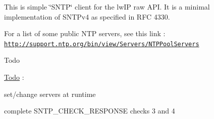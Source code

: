 This is simple \char`\"{}\+S\+N\+T\+P\char`\"{} client for the lw\+IP raw A\+PI. It is a minimal implementation of S\+N\+T\+Pv4 as specified in R\+FC 4330.

For a list of some public N\+TP servers, see this link \+: \href{http://support.ntp.org/bin/view/Servers/NTPPoolServers}{\tt http\+://support.\+ntp.\+org/bin/view/\+Servers/\+N\+T\+P\+Pool\+Servers}

\begin{DoxyRefDesc}{Todo}
\item[\hyperlink{todo__todo000015}{Todo}]\+:
\begin{DoxyItemize}
\item set/change servers at runtime
\item complete S\+N\+T\+P\+\_\+\+C\+H\+E\+C\+K\+\_\+\+R\+E\+S\+P\+O\+N\+SE checks 3 and 4 
\end{DoxyItemize}\end{DoxyRefDesc}
